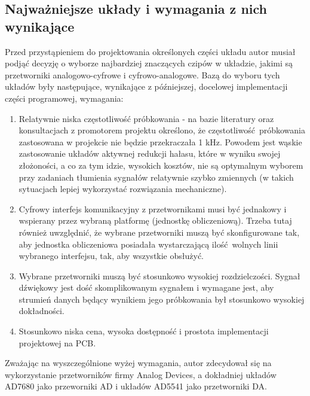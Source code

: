 \documentclass{scrartcl}
\begin{document}
\subsection{Najważniejsze układy i wymagania z nich wynikające}
Przed przystąpieniem do projektowania określonych części układu autor musiał podjąć decyzję o wyborze najbardziej znaczących czipów w układzie, jakimi są przetworniki analogowo-cyfrowe i cyfrowo-analogowe. Bazą do wyboru tych układów były następujące, wynikające z późniejszej, docelowej implementacji części programowej, wymagania:
\begin{enumerate}
    \item Relatywnie niska częstotliwość próbkowania - na bazie literatury oraz konsultacjach z promotorem projektu określono, że częstotliwość próbkowania zastosowana w projekcie nie będzie przekraczała 1 kHz. Powodem jest wąskie zastosowanie układów aktywnej redukcji hałasu, które w wyniku swojej złożoności, a co za tym idzie, wysokich kosztów, nie są optymalnym wyborem przy zadaniach tłumienia sygnałów relatywnie szybko zmiennych (w takich sytuacjach lepiej wykorzystać rozwiązania mechaniczne).
    \item Cyfrowy interfejs komunikacyjny z przetwornikami musi być jednakowy i wspierany przez wybraną platformę (jednostkę obliczeniową). Trzeba tutaj również uwzględnić, że wybrane przetworniki muszą być skonfigurowane tak, aby jednostka obliczeniowa posiadała wystarczającą ilość wolnych linii wybranego interfejsu, tak, aby wszystkie obsłużyć.
    \item Wybrane przetworniki muszą być stosunkowo wysokiej rozdzielczości. Sygnał dźwiękowy jest dość skomplikowanym sygnałem i wymagane jest, aby strumień danych będący wynikiem jego próbkowania był stosunkowo wysokiej dokładności.
    \item Stosunkowo niska cena, wysoka dostępność i prostota implementacji projektowej na PCB.
\end{enumerate}
Zważając na wyszczególnione wyżej wymagania, autor zdecydował się na wykorzystanie przetworników firmy Analog Devices, a dokładniej układów AD7680 jako przeworniki AD i układów AD5541 jako przetworniki DA. 
\end{document}
